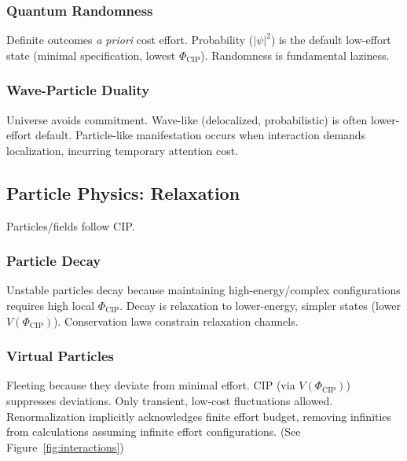 \documentclass[11pt, a4paper]{article}
\newcommand{\subt}[1]{\mathrm{#1}}
\begin{document}
\subsubsection{Quantum Randomness}
Definite outcomes \textit{a priori} cost effort. Probability ($|\psi|^2$) is the default low-effort state (minimal specification, lowest $\Phi_{\subt{CIP}}$). Randomness is fundamental laziness.

\subsubsection{Wave-Particle Duality}
Universe avoids commitment. Wave-like (delocalized, probabilistic) is often lower-effort default. Particle-like manifestation occurs when interaction demands localization, incurring temporary attention cost.

\subsection{Particle Physics: Relaxation}

Particles/fields follow CIP.

\subsubsection{Particle Decay}
Unstable particles decay because maintaining high-energy/complex configurations requires high local $\Phi_{\subt{CIP}}$. Decay is relaxation to lower-energy, simpler states (lower $V(\Phi_{\subt{CIP}})$). Conservation laws constrain relaxation channels.

\subsubsection{Virtual Particles}
Fleeting because they deviate from minimal effort. CIP (via $V(\Phi_{\subt{CIP}})$) suppresses deviations. Only transient, low-cost fluctuations allowed. Renormalization implicitly acknowledges finite effort budget, removing infinities from calculations assuming infinite effort configurations. (See Figure~\ref{fig:interactions})
\end{document}
